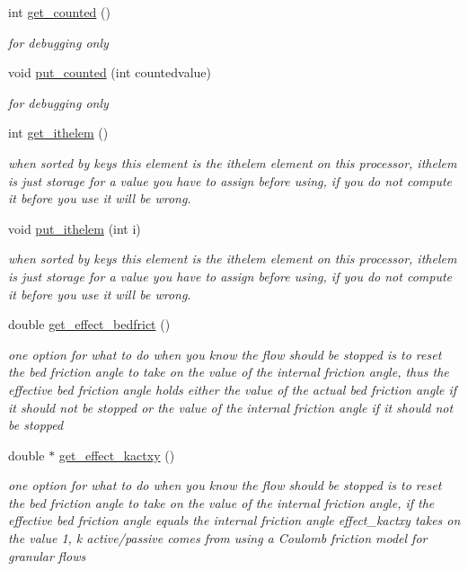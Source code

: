 \begin{CompactItemize}
int \hyperlink{classElement_a115}{get\_\-counted} ()
\begin{CompactList}\small\item\em for debugging only \item\end{CompactList}\item 
void \hyperlink{classElement_a116}{put\_\-counted} (int countedvalue)
\begin{CompactList}\small\item\em for debugging only \item\end{CompactList}\item 
int \hyperlink{classElement_a117}{get\_\-ithelem} ()
\begin{CompactList}\small\item\em when sorted by keys this element is the ithelem element on this processor, ithelem is just storage for a value you have to assign before using, if you do not compute it before you use it will be wrong. \item\end{CompactList}\item 
void \hyperlink{classElement_a118}{put\_\-ithelem} (int i)
\begin{CompactList}\small\item\em when sorted by keys this element is the ithelem element on this processor, ithelem is just storage for a value you have to assign before using, if you do not compute it before you use it will be wrong. \item\end{CompactList}\item 
double \hyperlink{classElement_a119}{get\_\-effect\_\-bedfrict} ()
\begin{CompactList}\small\item\em one option for what to do when you know the flow should be stopped is to reset the bed friction angle to take on the value of the internal friction angle, thus the effective bed friction angle holds either the value of the actual bed friction angle if it should not be stopped or the value of the internal friction angle if it should not be stopped \item\end{CompactList}\item 
double $\ast$ \hyperlink{classElement_a120}{get\_\-effect\_\-kactxy} ()
\begin{CompactList}\small\item\em one option for what to do when you know the flow should be stopped is to reset the bed friction angle to take on the value of the internal friction angle, if the effective bed friction angle equals the internal friction angle effect\_\-kactxy takes on the value 1, k active/passive comes from using a Coulomb friction model for granular flows \item\end{CompactList}\item 

\end{CompactItemize}
